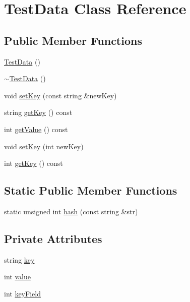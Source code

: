 \hypertarget{class_test_data}{\section{\-Test\-Data \-Class \-Reference}
\label{class_test_data}
}
\subsection*{\-Public \-Member \-Functions}
\begin{DoxyCompactItemize}
\item 
\hyperlink{class_test_data_aa4a3dd519ba3a3ae02956b627d42d123}{\-Test\-Data} ()
\item 
\hyperlink{class_test_data_af4ed2af760afe9e61fcf5333b008b2b9}{$\sim$\-Test\-Data} ()
\item 
void \hyperlink{class_test_data_a72cb0d5febcf77e8a6dd494fa6dff411}{set\-Key} (const string \&new\-Key)
\item 
string \hyperlink{class_test_data_ae20d0a4c5fba891d728c68ac4ec79654}{get\-Key} () const 
\item 
int \hyperlink{class_test_data_af33e667b6962f8a351f7a660a1a24c5e}{get\-Value} () const 
\item 
void \hyperlink{class_test_data_a609b8a4b0e3221bfb0b8cbd9efb108a7}{set\-Key} (int new\-Key)
\item 
int \hyperlink{class_test_data_a85ac27a4361a78d576dd8c10b1f97961}{get\-Key} () const 
\end{DoxyCompactItemize}
\subsection*{\-Static \-Public \-Member \-Functions}
\begin{DoxyCompactItemize}
\item 
static unsigned int \hyperlink{class_test_data_a55f0e2851aa330be9921303107982f98}{hash} (const string \&str)
\end{DoxyCompactItemize}
\subsection*{\-Private \-Attributes}
\begin{DoxyCompactItemize}
\item 
string \hyperlink{class_test_data_a16fe3a9a89c54e55fc56ae88590ae0c8}{key}
\item 
int \hyperlink{class_test_data_a8291f6b900b25a926deb1b2a393dc0ff}{value}
\item 
int \hyperlink{class_test_data_adafb60a315eaa088791c9e40f4a2618f}{key\-Field}
\end{DoxyCompactItemize}
